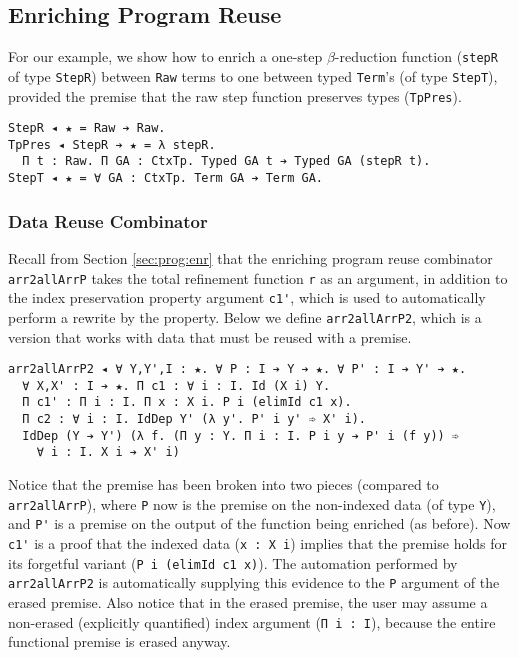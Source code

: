\documentclass[acmsmall,screen]{acmart}
\newcommand{\refsec}[1]{Section \ref{sec:#1}}
\newcommand{\labsec}[1]{\label{sec:#1}}
\begin{document}
\subsection{Enriching Program Reuse}
\labsec{rel:penr}

For our example, we show how to enrich a one-step $\beta$-reduction
function (\verb;stepR; of type \verb;StepR;) between \verb;Raw; terms to one
between typed \verb;Term;'s (of type \verb;StepT;), provided the
premise that the raw step function preserves types (\verb;TpPres;).
\begin{verbatim}
StepR ◂ ★ = Raw ➔ Raw.
TpPres ◂ StepR ➔ ★ = λ stepR. 
  Π t : Raw. Π GA : CtxTp. Typed GA t ➔ Typed GA (stepR t).
StepT ◂ ★ = ∀ GA : CtxTp. Term GA ➔ Term GA.
\end{verbatim}

\subsubsection{Data Reuse Combinator}

Recall from \refsec{prog:enr} that the enriching program reuse
combinator \verb;arr2allArrP; takes the total refinement function \verb;r;
as an argument, in addition to the index preservation property
argument \verb;c1';, which is used to automatically perform a rewrite
by the property. Below we define \verb;arr2allArrP2;, which is a
version that works with data that must be reused with a premise.
\begin{verbatim}
arr2allArrP2 ◂ ∀ Y,Y',I : ★. ∀ P : I ➔ Y ➔ ★. ∀ P' : I ➔ Y' ➔ ★.
  ∀ X,X' : I ➔ ★. Π c1 : ∀ i : I. Id (X i) Y.
  Π c1' : Π i : I. Π x : X i. P i (elimId c1 x).
  Π c2 : ∀ i : I. IdDep Y' (λ y'. P' i y' ➾ X' i).
  IdDep (Y ➔ Y') (λ f. (Π y : Y. Π i : I. P i y ➔ P' i (f y)) ➾
    ∀ i : I. X i ➔ X' i)
\end{verbatim}
Notice that the premise has been broken into two pieces (compared to
\verb;arr2allArrP;), where \verb;P; now is the premise on the
non-indexed data (of type \verb;Y;), and \verb;P'; is a premise on the
output of the function being enriched (as before). Now \verb;c1'; is a
proof that the indexed data (\verb;x : X i;) implies that the premise
holds for its forgetful variant (\verb;P i (elimId c1 x);). The
automation performed by \verb;arr2allArrP2; is automatically supplying
this evidence to the \verb;P; argument of the erased premise. Also
notice that in the erased premise, the user may assume a non-erased
(explicitly quantified) index argument (\verb;Π i : I;), because the
entire functional premise is erased anyway.
\end{document}
